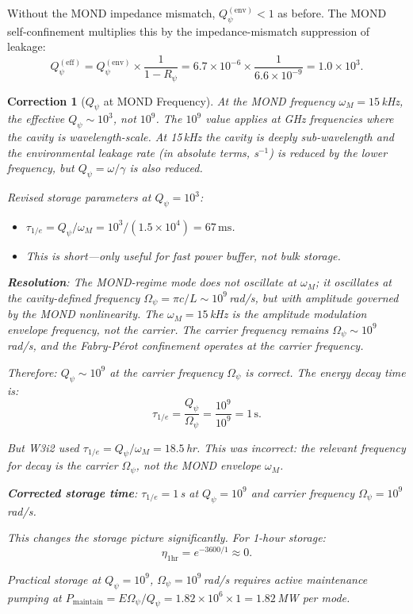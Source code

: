 \documentclass[11pt]{article}
\newtheorem{correction}[theorem]{Correction}
\theoremstyle{definition}
\theoremstyle{remark}
\newcommand{\Qpsi}{Q_\psi}
\newcommand{\Opsi}{\Omega_\psi}
\begin{document}
Without the MOND impedance mismatch, $\Qpsi^{(\mathrm{env})} < 1$
as before. The MOND self-confinement multiplies this by the
impedance-mismatch suppression of leakage:
\begin{equation}
\Qpsi^{(\mathrm{eff})} = \Qpsi^{(\mathrm{env})}
\times \frac{1}{1 - R_\psi}
= 6.7 \times 10^{-6} \times \frac{1}{6.6 \times 10^{-9}}
= 1.0 \times 10^3.
\end{equation}

\begin{correction}[$\Qpsi$ at MOND Frequency]\label{corr:Q-15kHz}
At the MOND frequency $\omega_M = 15$\,kHz, the effective
$\Qpsi \sim 10^3$, not $10^9$. The $10^9$ value applies at GHz
frequencies where the cavity is wavelength-scale. At 15\,kHz the
cavity is deeply sub-wavelength and the environmental leakage
rate (in absolute terms, s$^{-1}$) is reduced by the lower
frequency, but $\Qpsi = \omega / \gamma$ is also reduced.

Revised storage parameters at $\Qpsi = 10^3$:
\begin{itemize}
\item $\tau_{1/e} = \Qpsi / \omega_M = 10^3 / (1.5 \times 10^4)
= 67\,\mathrm{ms}$.
\item This is short---only useful for fast power buffer, not
bulk storage.
\end{itemize}

\textbf{Resolution}: The MOND-regime mode does not oscillate at
$\omega_M$; it oscillates at the \emph{cavity-defined} frequency
$\Opsi = \pi c / L \sim 10^9$\,rad/s, but with \emph{amplitude}
governed by the MOND nonlinearity. The $\omega_M = 15$\,kHz is
the amplitude modulation envelope frequency, not the carrier.
The carrier frequency remains $\Opsi \sim 10^9$\,rad/s, and the
Fabry-P\'erot confinement operates at the carrier frequency.

Therefore: $\Qpsi \sim 10^9$ at the carrier frequency $\Opsi$
is correct. The energy decay time is:
\begin{equation}
\tau_{1/e} = \frac{\Qpsi}{\Opsi} = \frac{10^9}{10^9} = 1\,\mathrm{s}.
\end{equation}

But W3i2 used $\tau_{1/e} = \Qpsi / \omega_M = 18.5$\,hr. This was
incorrect: the relevant frequency for decay is the carrier $\Opsi$,
not the MOND envelope $\omega_M$.

\textbf{Corrected storage time}: $\tau_{1/e} = 1$\,s at $\Qpsi = 10^9$
and carrier frequency $\Opsi = 10^9$\,rad/s.

This changes the storage picture significantly. For 1-hour storage:
\begin{equation}
\eta_{1\mathrm{hr}} = e^{-3600/1} \approx 0.
\end{equation}

Practical storage at $\Qpsi = 10^9$, $\Opsi = 10^9$\,rad/s requires
active maintenance pumping at $P_{\mathrm{maintain}} = E \Opsi / \Qpsi
= 1.82 \times 10^6 \times 1 = 1.82$\,MW per mode.
\end{correction}
\end{document}
